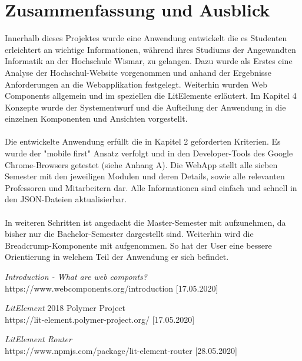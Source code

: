 \documentclass[12pt,					%
							 oneside,			%
							 a4paper,			%
							 halfparskip,		%
							 liststotoc,			%
							 bibtotoc,			%
							 fleqn,				%
							 pointlessnumbers]	%
							 {scrreprt}
\begin{document}
\chapter{Zusammenfassung und Ausblick}     
Innerhalb dieses Projektes wurde eine Anwendung entwickelt die es Studenten erleichtert an wichtige Informationen,   während ihres Studiums der Angewandten Informatik an der Hochschule Wismar, zu gelangen. Dazu wurde als Erstes eine Analyse der Hochschul-Website vorgenommen und anhand der Ergebnisse Anforderungen an die Webapplikation festgelegt. Weiterhin wurden Web Components allgemein und im speziellen die LitElemente erläutert. Im Kapitel 4 Konzepte wurde der Systementwurf und die Aufteilung der Anwendung in die einzelnen Komponenten und Ansichten vorgestellt. \\
\\
Die entwickelte Anwendung erfüllt die in Kapitel 2 geforderten Kriterien. Es wurde der "mobile first" Ansatz verfolgt und in den Developer-Tools des Google Chrome-Browsers getestet (siehe Anhang A). Die WebApp stellt alle sieben Semester mit den jeweiligen Modulen und deren Details, sowie alle relevanten Professoren und Mitarbeitern dar. Alle Informationen sind einfach und schnell in den JSON-Dateien aktualisierbar.\\
\\
In weiteren Schritten ist angedacht die Master-Semester mit aufzunehmen, da bisher nur die Bachelor-Semester dargestellt sind. Weiterhin wird die Breadcrump-Komponente mit aufgenommen. So hat der User eine bessere Orientierung in welchem Teil der Anwendung er sich befindet.
		
	
	
	\nocite{*}						%


\begin{thebibliography}{unsrt}
 \textit{Introduction - What are web componts?} \\
https://www.webcomponents.org/introduction [17.05.2020]

 \textit{LitElement} 2018 Polymer Project\\
https://lit-element.polymer-project.org/ [17.05.2020]

 \textit{LitElement Router}\\
https://www.npmjs.com/package/lit-element-router [28.05.2020]

\end{thebibliography}	
\end{document}
